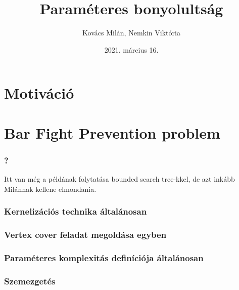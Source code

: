 \documentclass[aspectratio=169]{beamer}
\begin{document}
\title{Paraméteres bonyolultság}
\author{Kovács Milán, Nemkin Viktória}
\date{2021. március 16.}

\frame{\titlepage}


\section{Motiváció}






\section{Bar Fight Prevention problem}












\begin{frame}
\frametitle{?}
Itt van még a példának folytatása bounded search tree-kkel, de azt inkább Milánnak kellene elmondania.
\end{frame}

\begin{frame}
\frametitle{Kernelizációs technika általánosan}
\end{frame}


\begin{frame}
\frametitle{Vertex cover feladat megoldása egyben}
\end{frame}

\begin{frame}
\frametitle{Paraméteres komplexitás definíciója általánosan}
\end{frame}

\begin{frame}
\frametitle{Szemezgetés}
\end{frame}
\end{document}
